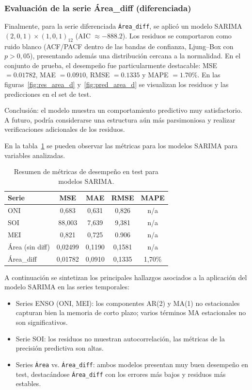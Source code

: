 \subsubsection{Evaluación de la serie Área\_diff (diferenciada)}
Finalmente, para la serie diferenciada \texttt{Área\_diff}, se aplicó un modelo SARIMA\\$(2,0,1)\times(1,0,1)_{12}$ (AIC $\approx -888.2$). 
Los residuos se comportaron como ruido blanco (ACF/PACF dentro de las bandas de confianza, Ljung--Box con $p>0,05$), presentando además una distribución cercana a la normalidad.  
En el conjunto de prueba, el desempeño fue particularmente destacable: MSE $=0.01782$, MAE $=0.0910$, RMSE $=0.1335$ y MAPE $=1.70\%$. En las figuras~\ref{fig:res_area_d} y~\ref{fig:pred_area_d} se visualizan los residuos y las predicciones en el set de test.


Conclusión: el modelo muestra un comportamiento predictivo muy satisfactorio. A futuro, podría considerarse una estructura aún más parsimoniosa y realizar verificaciones adicionales de los residuos.  
\vspace{0.3em}



En la tabla~\ref{tab:metricas_sarima} se pueden observar las métricas para los modelos SARIMA para variables analizadas. 

\begin{table}[H]
\centering
\caption{Resumen de métricas de desempeño en test para modelos SARIMA.}
\label{tab:metricas_sarima}
\begin{tabular}{lcccc}
\toprule
\textbf{Serie} & \textbf{MSE} & \textbf{MAE} & \textbf{RMSE} & \textbf{MAPE} \\
\midrule
ONI  & 0,683  & 0,631  & 0,826  & n/a \\
SOI  & 88,003 & 7,639  & 9,381  & n/a \\
MEI  & 0,821  & 0,725  & 0.906  & n/a \\
Área (sin diff) & 0,02499 & 0,1190 & 0,1581 & n/a \\
Área\_diff      & 0,01782 & 0,0910 & 0,1335 & 1,70\% \\
\bottomrule
\end{tabular}
\end{table}

A continuación se sintetizan los principales hallazgos asociados a la aplicación del modelo SARIMA en las series temporales:

\begin{itemize}
    \item Series ENSO (ONI, MEI): los componentes AR(2) y MA(1) no estacionales
    capturan bien la memoria de corto plazo; varios términos MA estacionales no son
    significativos.
    \item Serie SOI: los residuos no muestran autocorrelación, las métricas de la precisión predictiva son altas.
    \item Series \texttt{Área} vs. \texttt{Área\_diff}: ambos modelos presentan muy buen desempeño en test,
    destacándose \texttt{Área\_diff} con los errores más bajos y residuos más
    estables.
\end{itemize}

